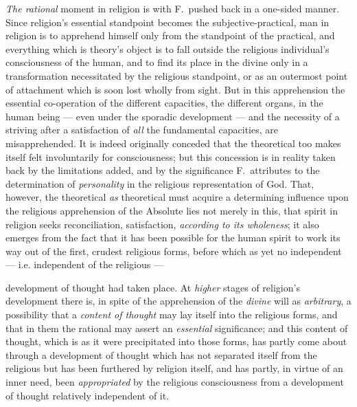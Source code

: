 \documentclass[12pt,a4paper]{book}
\begin{document}
\emph{The rational} moment in religion is with F.\ pushed back in a one-sided
manner. Since religion's essential standpoint becomes the
subjective-practical, man in religion is to apprehend himself only from the
standpoint of the practical, and everything which is theory's object is to
fall outside the religious individual's consciousness of the human, and to
find its place in the divine only in a transformation necessitated by the
religious standpoint, or as an outermost point of attachment which is soon
lost wholly from sight. But in this apprehension the essential co-operation of
the different capacities, the different organs, in the human being --- even
under the sporadic development --- and the necessity of a striving after a
satisfaction of \emph{all} the fundamental capacities, are misapprehended. It
is indeed originally conceded that the theoretical too makes itself felt
involuntarily for consciousness; but this concession is in reality taken back
by the limitations added, and by the significance F.\ attributes to the
determination of \emph{personality} in the religious representation of God.
That, however, the theoretical \emph{as} theoretical must acquire a
determining influence upon the religious apprehension of the Absolute lies not
merely in this, that spirit in religion seeks reconciliation, satisfaction,
\emph{according to its wholeness}; it also emerges from the fact that it has
been possible for the human spirit to work its way out of the first, crudest
religious forms, before which as yet no independent --- i.e. independent of
the religious ---

development of thought had taken place. At \emph{higher} stages of religion's
development
\setcounter{footnote}{0}%
there is, in spite of the apprehension of the \emph{divine} will as
\emph{arbitrary}, a possibility that a \emph{content of thought} may lay
itself into the religious forms, and that in them the rational may assert an
\emph{essential} significance; and this content of thought, which is as it
were precipitated into those forms, has partly come about through a
development of thought which has not separated itself from the religious but
has been furthered by religion itself, and has partly, in virtue of an inner
need, been \emph{appropriated} by the religious consciousness from a
development of thought relatively independent of it.
\end{document}
